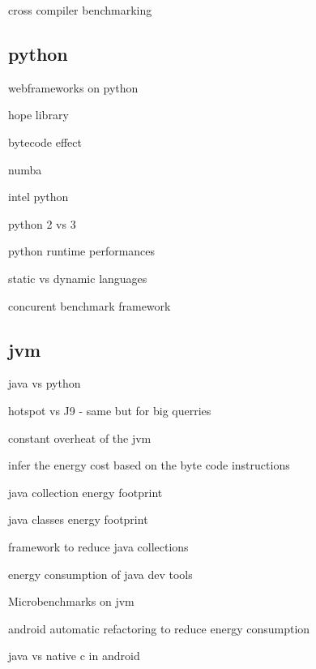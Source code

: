 cross compiler benchmarking \cite{yet2016cross}

\subsection{python}

webframeworks on python \cite{pankiv_concurrent_nodate}

hope library \cite{akeret_hope_2015}

bytecode effect \cite{ben_asher_effect_2009}

numba \cite{crist_dask_2016}

intel python \cite{li_boosting_2016}

python 2 vs 3 \cite{modzelewski_pyston_2020}

python runtime performances \cite{redondo_comprehensive_2015} \cite{murri_performance_2013}

static vs dynamic languages \cite{pang_what_nodate}

concurent benchmark framework \cite{pankiv2019concurrent}


\subsection{jvm}

java vs python \cite{destefanis_statistical_2016}

hotspot vs J9 \cite{oi2011power} - same but for big querries \cite{chiba2018towards}

constant overheat of the jvm \cite{lafond2006energy}

infer the energy cost based on the byte code instructions \cite{ma2017biogeography}

java collection energy footprint  \cite{pinto2016comprehensive} \cite{fernandes2017assisting}

java classes energy footprint \cite{hasan2016energy}

framework to reduce java collections \cite{manotas2014seeds}

energy consumption of java dev tools \cite{baskar2013experimental}

Microbenchmarks on jvm \cite{longo2019reducing} \cite{baskar2013experimental}

android automatic refactoring to reduce energy consumption \cite{banerjee2016automated} \cite{rodriguez2017reducing}

java vs native c in android \cite{corral2014method}





